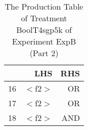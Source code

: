 \begin{table}[ht]
\centering
\begin{tabular}{rrr}
  \hline
 & LHS & RHS \\ 
  \hline
16 & $<$f2$>$ & OR \\ 
  17 & $<$f2$>$ & OR \\ 
  18 & $<$f2$>$ & AND \\ 
   \hline
\end{tabular}
\caption{The Production Table of Treatment BoolT4sgp5k of Experiment ExpB (Part 2)} 
\end{table}

